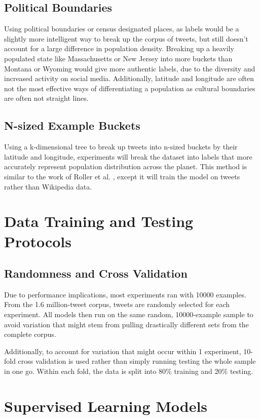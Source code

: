 \documentclass[midd]{thesis}
\begin{document}
\subsection{Political Boundaries}
Using political boundaries or census designated places, as labels would be a slightly more intelligent way to break up the corpus of tweets, but still doesn't account for a large difference in population density. Breaking up a heavily populated state like Massachusetts or New Jersey into more buckets than Montana or Wyoming would give more authentic labels, due to the diversity and increased activity on social media. Additionally, latitude and longitude are often not the most effective ways of differentiating a population as cultural boundaries are often not straight lines.

\subsection{N-sized Example Buckets}
Using a k-dimensional tree to break up tweets into n-sized buckets by their latitude and longitude, experiments will break the dataset into labels that more accurately represent population distribution across the planet. This method is similar to the work of Roller et al. \cite{roller2012supervised}, except it will train the model on tweets rather than Wikipedia data.

\section{Data Training and Testing Protocols}

\subsection{Randomness and Cross Validation}
Due to performance implications, most experiments ran with 10000 examples. From the 1.6 million-tweet corpus, tweets are randomly selected for each experiment. All models then run on the same random, 10000-example sample to avoid variation that might stem from pulling drastically different sets from the complete corpus.

Additionally, to account for variation that might occur within 1 experiment, 10-fold cross validation is used rather than simply running testing the whole sample in one go. Within each fold, the data is split into 80\% training and 20\% testing.

\section{Supervised Learning Models}
\end{document}
